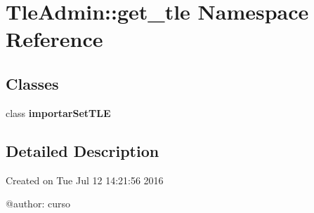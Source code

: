 \section{\-Tle\-Admin\-:\-:get\-\_\-tle \-Namespace \-Reference}
\label{namespace_tle_admin_1_1get__tle}
\subsection*{\-Classes}
\begin{DoxyCompactItemize}
\item 
class {\bf importar\-Set\-T\-L\-E}
\end{DoxyCompactItemize}


\subsection{\-Detailed \-Description}
\begin{DoxyVerb}
Created on Tue Jul 12 14:21:56 2016

@author: curso
\end{DoxyVerb}
 